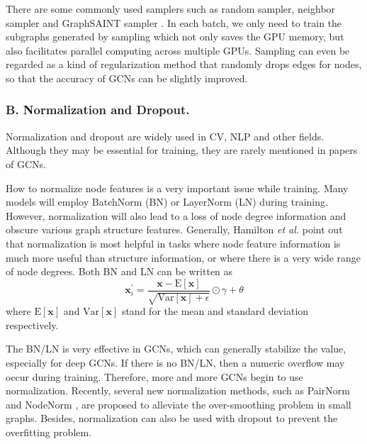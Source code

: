 \documentclass[runningheads]{llncs}
\begin{document}
There are some commonly used samplers such as random sampler, neighbor
sampler \cite{hamilton2017inductive} and GraphSAINT sampler \cite{zeng2019graphsaint}. In each batch, we only
need to train the subgraphs generated by sampling which not only saves the 
GPU memory, but also facilitates parallel computing across
multiple GPUs. Sampling can even be regarded as a kind of regularization method that randomly drops edges for nodes, so that the accuracy of GCNs can be slightly improved.



\subsubsection{B. Normalization and
Dropout.}
Normalization and dropout \cite{srivastava2014dropout} are widely used in CV, NLP and other fields.
Although they may be essential for training, they are rarely mentioned
in papers of GCNs. 

How to normalize node features  is a very important issue while training. Many models will employ  BatchNorm (BN) \cite{ioffe2015batch} or LayerNorm (LN) \cite{ba2016layer} during training. However, normalization will also lead to a loss of node degree information and obscure various graph structure
features. Generally, Hamilton \textsl{et al.} \cite{hamilton2020graph} point out that normalization is most helpful in tasks where node feature information is much
more useful than structure information, or where there is a very wide range of node degrees. Both BN and LN can be written as
\begin{equation}
\bm{x}^{\prime}_i = \frac{\bm{x} -
        \textrm{E}[\bm{x}]}{\sqrt{\textrm{Var}[\bm{x}] + \epsilon}}
        \odot \gamma + \theta
\end{equation}
where $\textrm{E}[\bm{x}]$ and $\textrm{Var}[\bm{x}]$ stand for the mean and standard deviation respectively.

The BN/LN is very effective in GCNs, which can generally
stabilize the value, especially for deep GCNs. If there is
no BN/LN, then a numeric overflow may occur during training. Therefore, more and more GCNs
begin to use normalization. Recently, several new normalization methods, such as PairNorm \cite{zhao2019pairnorm} and NodeNorm \cite{zhou2020understanding}, are proposed to alleviate the over-smoothing problem in small graphs. Besides, normalization can also be used with dropout to prevent the overfitting problem.
\end{document}
